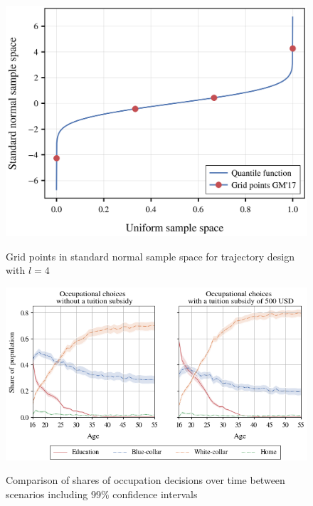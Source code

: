 \begin{figure}[H]
	\caption[Grid points in standard normal sample]{Grid points in standard normal sample space for trajectory design with $l=4$}
	\centering
	\includegraphics[scale=0.40]{../scrypy/figures/quantile_fct}
	\label{fig:invcdf}
\end{figure}



\begin{figure}[H]
	\caption[Comparison of uncertain shares of occupation decisions]{Comparison of shares of occupation decisions over time between scenarios including 99$\%$ confidence intervals}
	\centering
	\includegraphics[scale=0.75]{../scrypy/figures/cone_plot_choice_shares}
	\label{fig:uq_paths}
\end{figure}

\vspace{10mm} %


